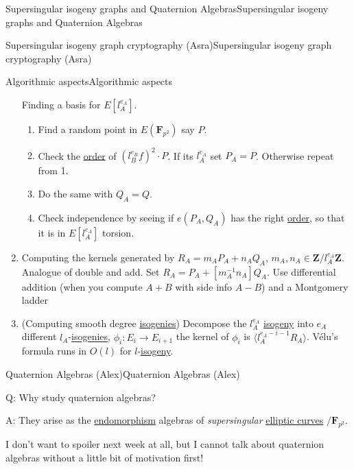 \documentclass[10pt,]{book}
\numberwithin{equation}{section}
\newcommand{\inv}{^{-1}}
\newcommand{\lb}{[}
\newcommand{\rb}{]}
\newcommand{\ZZ}{\mathbf{Z}}
\newcommand{\FF}{\mathbf{F}}
\begin{document}
\begin{chapterptx}{Supersingular isogeny graphs and Quaternion Algebras}{}{Supersingular isogeny graphs and Quaternion Algebras}{}{}
\begin{sectionptx}{Supersingular isogeny graph cryptography (Asra)}{}{Supersingular isogeny graph cryptography (Asra)}{}{}
\begin{subsectionptx}{Algorithmic aspects}{}{Algorithmic aspects}{}{}
\begin{enumerate}
Finding a basis for \(E\lb l_A^{e_A}\rb\).%
\begin{enumerate}
\item\hypertarget{li-221}{}Find a random point in \(E(\FF_{p^2})\) say \(P\).%
\item\hypertarget{li-222}{}Check the \hyperref[def-order-quaternion]{order} of \((l_B^{e_B} f)^2 \cdot P\). If its \(l_A^{e_A}\) set \(P_A = P\). Otherwise repeat from 1.%
\item\hypertarget{li-223}{}Do the same with \(Q_A = Q\).%
\item\hypertarget{li-224}{}Check independence by seeing if \(e(P_A,Q_A) \) has the right \hyperref[def-order-quaternion]{order}, so that it is in \(E\lb l_A^{e_A} \rb\) torsion.%
\end{enumerate}
%
\item\hypertarget{li-225}{}Computing the kernels generated by \(R_A = m_A P_A + n_A Q_A\), \(m_A, n_A \in \ZZ/l_A^{e_A} \ZZ\). Analogue of double and add. Set \(R_A = P_A + \lb m_A\inv n_A\rb Q_A\). Use differential addition (when you compute \(A+B\) with side info \(A-B\)) and a Montgomery ladder%
\item\hypertarget{li-226}{}(Computing smooth degree \hyperref[def-supersing-isog-isog]{isogenies}) Decompose the \(l_A^{e_A}\) \hyperref[def-supersing-isog-isog]{isogeny} into \(e_A\) different \(l_A\)-\hyperref[def-supersing-isog-isog]{isogenies}, \(\phi_i\colon E_i \to E_{i+1}\) the kernel of \(\phi_i\) is \(\langle l_A^{e_A - i - 1} R_A\rangle\). Vélu's formula runs in \(O(l)\) for \(l\)-\hyperref[def-supersing-isog-isog]{isogeny}.%
\end{enumerate}
%
\end{subsectionptx}
\end{sectionptx}
%
%
\typeout{************************************************}
\typeout{************************************************}
%
\begin{sectionptx}{Quaternion Algebras (Alex)}{}{Quaternion Algebras (Alex)}{}{}\label{sec-quaternion-algebras}
\begin{introduction}{}%
\hypertarget{p-865}{}%
Q: Why study quaternion algebras?%
\par
\hypertarget{p-866}{}%
A: They arise as the \hyperref[def-supersing-isog-endo]{endomorphism} algebras of \emph{supersingular} \hyperref[def-supersing-isog-ec]{elliptic curves} \(/\FF_{p^2}\).%
\par
\hypertarget{p-867}{}%
I don't want to spoiler next week at all, but I cannot talk about quaternion algebras without a little bit of motivation first!%

\end{introduction}
\end{sectionptx}
\end{chapterptx}
\end{document}
